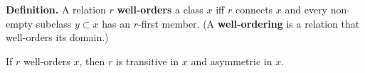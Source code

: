 \textbf{Definition.} A relation $r$ \textbf{well-orders} a class $x$ iff $r$ connects $x$ and every non-empty subclass $y \subset x$ has an $r$-first member. (A \textbf{well-ordering} is a relation that well-orders its domain.)

If $r$ well-orders $x$, then $r$ is transitive in $x$ and asymmetric in $x$.
